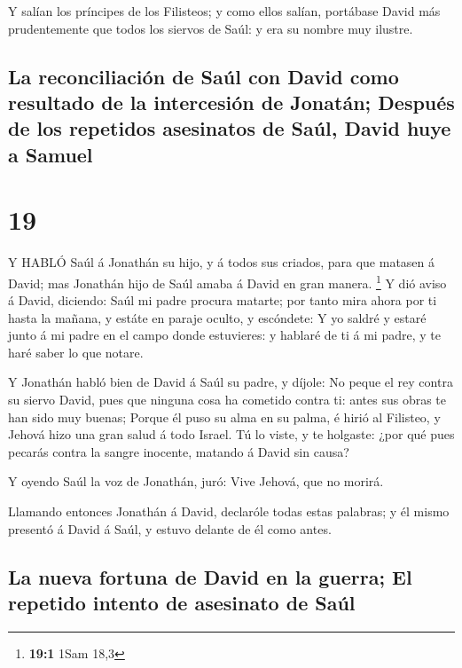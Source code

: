  Y salían los príncipes de los Filisteos; y como ellos
salían, portábase David más prudentemente que todos los siervos de Saúl:
y era su nombre muy ilustre.

\hypertarget{la-reconciliaciuxf3n-de-sauxfal-con-david-como-resultado-de-la-intercesiuxf3n-de-jonatuxe1n-despuuxe9s-de-los-repetidos-asesinatos-de-sauxfal-david-huye-a-samuel}{%
\subsection{La reconciliación de Saúl con David como resultado de la
intercesión de Jonatán; Después de los repetidos asesinatos de Saúl,
David huye a
Samuel}\label{la-reconciliaciuxf3n-de-sauxfal-con-david-como-resultado-de-la-intercesiuxf3n-de-jonatuxe1n-despuuxe9s-de-los-repetidos-asesinatos-de-sauxfal-david-huye-a-samuel}}

\hypertarget{section-18}{%
\section{19}\label{section-18}}

 Y HABLÓ Saúl á Jonathán su hijo, y á todos sus criados,
para que matasen á David; mas Jonathán hijo de Saúl amaba á David en
gran manera. \footnote{\textbf{19:1} 1Sam 18,3}  Y dió aviso
á David, diciendo: Saúl mi padre procura matarte; por tanto mira ahora
por ti hasta la mañana, y estáte en paraje oculto, y escóndete:
 Y yo saldré y estaré junto á mi padre en el campo donde
estuvieres: y hablaré de ti á mi padre, y te haré saber lo que notare.

 Y Jonathán habló bien de David á Saúl su padre, y díjole:
No peque el rey contra su siervo David, pues que ninguna cosa ha
cometido contra ti: antes sus obras te han sido muy buenas; 
Porque él puso su alma en su palma, é hirió al Filisteo, y Jehová hizo
una gran salud á todo Israel. Tú lo viste, y te holgaste: ¿por qué pues
pecarás contra la sangre inocente, matando á David sin causa?

 Y oyendo Saúl la voz de Jonathán, juró: Vive Jehová, que no
morirá.

 Llamando entonces Jonathán á David, declaróle todas estas
palabras; y él mismo presentó á David á Saúl, y estuvo delante de él
como antes.

\hypertarget{la-nueva-fortuna-de-david-en-la-guerra-el-repetido-intento-de-asesinato-de-sauxfal}{%
\subsection{La nueva fortuna de David en la guerra; El repetido intento
de asesinato de
Saúl}\label{la-nueva-fortuna-de-david-en-la-guerra-el-repetido-intento-de-asesinato-de-sauxfal}}

